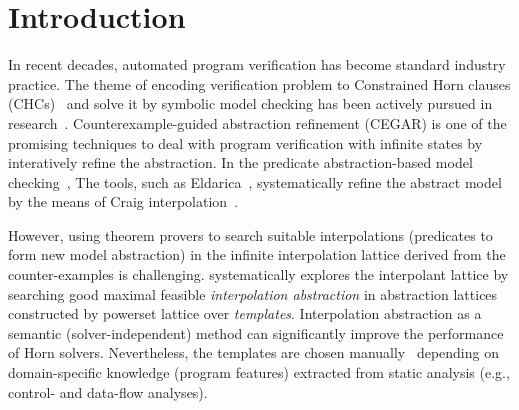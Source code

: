 



\section{Introduction}
In recent decades, automated program verification has become standard industry practice. 
%
The theme of encoding verification problem to Constrained Horn clauses (CHCs)~\cite{10.2307/2268661} and solve it by symbolic model checking has been actively pursued in research~\cite{Bjorner2015}. 
%
Counterexample-guided abstraction refinement (CEGAR) \cite{10.1007/10722167_15} is one of the promising techniques to deal with program verification with infinite states by interatively refine the abstraction. In the predicate abstraction-based model checking~\cite{10.1007/3-540-63166-6_10,10.1145/964001.964021}, The tools, such as %
Eldarica~\cite{ruemmer2013disjunctive}, systematically refine the abstract model by the means of Craig interpolation~\cite{10.2307/2963593}.


However, using theorem provers to search suitable interpolations (predicates to form new model abstraction) in the infinite interpolation lattice derived from the counter-examples is challenging. 
%
\cite{Leroux2016} systematically explores the interpolant lattice by searching good maximal feasible \emph{interpolation abstraction} in abstraction lattices constructed by powerset lattice over \emph{templates}.
Interpolation abstraction as a semantic (solver-independent) method can significantly improve the performance of Horn solvers.
%
Nevertheless, the templates are chosen manually~\cite{10.1007/978-3-319-57288-8_18} depending on domain-specific knowledge (program features) extracted from static analysis (e.g., control- and data-flow analyses). 


